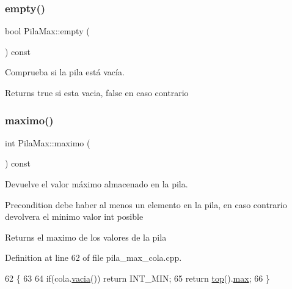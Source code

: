 \subsubsection{\texorpdfstring{empty()}{empty()}\hspace{0.1cm}{\footnotesize\ttfamily [2/2]}}
{\footnotesize\ttfamily bool Pila\+Max\+::empty (\begin{DoxyParamCaption}{ }\end{DoxyParamCaption}) const}



Comprueba si la pila está vacía. 

\begin{DoxyReturn}{Returns}
true si esta vacia, false en caso contrario 
\end{DoxyReturn}
\mbox{\label{classPilaMax_aeed1b737e5130f0d281b90303e1cf9bd}} 
\subsubsection{\texorpdfstring{maximo()}{maximo()}\hspace{0.1cm}{\footnotesize\ttfamily [1/2]}}
{\footnotesize\ttfamily int Pila\+Max\+::maximo (\begin{DoxyParamCaption}{ }\end{DoxyParamCaption}) const}



Devuelve el valor máximo almacenado en la pila. 

\begin{DoxyPrecond}{Precondition}
debe haber al menos un elemento en la pila, en caso contrario devolvera el minimo valor int posible
\end{DoxyPrecond}
\begin{DoxyReturn}{Returns}
el maximo de los valores de la pila 
\end{DoxyReturn}


Definition at line 62 of file pila\+\_\+max\+\_\+cola.\+cpp.


\begin{DoxyCode}
62                          \{
63 
64   \textcolor{keywordflow}{if}(cola.\hyperlink{classCola_a2c746a66289cd4f90d4e43f712b72fb6}{vacia}()) \textcolor{keywordflow}{return} INT\_MIN;
65     \textcolor{keywordflow}{return} \hyperlink{classPilaMax_a6ddf2f4ad4699aabf25434fdb84fcd75}{top}().\hyperlink{structElemento_a9971eb72e5c21f568f1135947c3919f7}{max};
66 \}
\end{DoxyCode}
\mbox{\label{classPilaMax_aeed1b737e5130f0d281b90303e1cf9bd}} 
